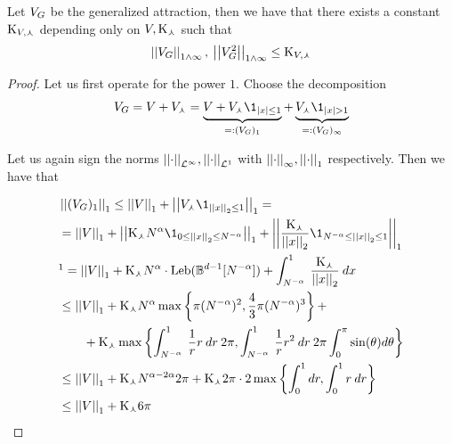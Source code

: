 \begin{lemma}\label{ch5:lemma:eval-norm-gen-attr}
	Let $V_{G}$ be the generalized attraction, then we have that there exists a constant $\text{K}_{V,\curlywedge}$ depending only on $V, \text{K}_\curlywedge$ such that
	\begin{align}
		\left|\left| V_{G} \right|\right|_{1 \wedge \infty}, \:
		\left|\left| V_{G}^2 \right|\right|_{1 \wedge \infty} 
		\leq \text{K}_{V,\curlywedge}
	\end{align}
\end{lemma}

\begin{proof}
	Let us first operate for the power $1$.
	Choose the decomposition 
	\begin{equation}
		\genAttraction = \attraction + \cutoffSinAttraction = 
		\underbrace{ 
			\attraction + \cutoffSinAttraction \1_{\norm{x} \leq 1}
		}_{=:(\genAttraction)_1}
		+
		\underbrace{
			\cutoffSinAttraction \1_{\norm{x} > 1}
		}_{=:(\genAttraction)_\infty}
	\end{equation}
	
	Let us again sign the norms ${ \left| \left| \cdot \right| \right|_{\mathcal{L}^\infty} },{ \left| \left| \cdot \right| \right|_{\mathcal{L}^1} }$ with $ { \left| \left| \cdot \right| \right|_{\infty} }, { \left| \left| \cdot \right| \right|_{1} }$ respectively.
	Then we have that
	
	\begin{align*}
		&\Norm{(\genAttraction)_1}_1
		\leq
		\Norm{\attraction}_1 + \Norm{\cutoffSinAttraction \1_{\Normp{2}{x} \leq 1}}_1
		=
		\\
		&=
		\Norm{\attraction}_1 + \Norm{\const_\curlywedge N^\alpha \1_{0 \leq \Normp{2}{x} \leq N^{-\alpha}}}_1 + \Norm{\frac{\const_\curlywedge}{\Normp{2}{x}} \1_{N^{-\alpha} \leq \Normp{2}{x} \leq 1}}_1
		\\
		&\footnotemark[1]=
		\Norm{\attraction}_1 + \const_\curlywedge N^{\alpha} \cdot \lebsge (\Ball^{d-1}[N^{-\alpha}]) + \int_{N^{-\alpha}}^1 \: \frac{\const_\curlywedge}{\Normp{2}{x}} \: dx
		\\
		& \leq
		\Norm{\attraction}_1 
		+ \const_\curlywedge N^{\alpha} 
		\max \left\{
		\pi (N^{-\alpha})^2
		,\frac{4}{3} \pi (N^{-\alpha})^3
		\right\}
		+
		\\
		&\qquad
		+
		\const_\curlywedge
		\max \left\{
		\int_{N^{-\alpha}}^1  \: \frac{1}{r} r\: dr \:2\pi
		,\int_{N^{-\alpha}}^1  \: \frac{1}{r} r^2\: dr \: 2 \pi \int_0^\pi \sin(\theta) d\theta
		\right\}
		\\
		& \leq 
		\Norm{\attraction}_1 
		+ \const_\curlywedge N^{\alpha-2\alpha} 2 \pi
		+ \const_\curlywedge 2 \pi \cdot 2 \max \left\{
		\int_0^1 dr
		,\int_0^1  r\: dr
		\right\}
		\\
		& \leq
		\Norm{\attraction}_1
		+ \const_\curlywedge 6\pi 
	\end{align*}
	

\end{proof}
